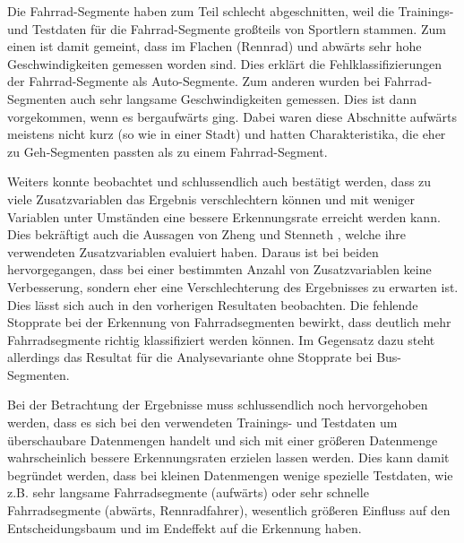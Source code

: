 Die Fahrrad-Segmente haben zum Teil schlecht abgeschnitten, weil die Trainings- und Testdaten für die Fahrrad-Segmente großteils von Sportlern stammen. Zum einen ist damit gemeint, dass im Flachen (Rennrad) und abwärts sehr hohe Geschwindigkeiten gemessen worden sind. Dies erklärt die Fehlklassifizierungen der Fahrrad-Segmente als Auto-Segmente. Zum anderen wurden bei Fahrrad-Segmenten auch sehr langsame Geschwindigkeiten gemessen. Dies ist dann vorgekommen, wenn es bergaufwärts ging. Dabei waren diese Abschnitte aufwärts meistens nicht kurz (so wie in einer Stadt) und hatten Charakteristika, die eher zu Geh-Segmenten passten als zu einem Fahrrad-Segment.

Weiters konnte beobachtet und schlussendlich auch bestätigt werden, dass zu viele Zusatzvariablen das Ergebnis verschlechtern können und mit weniger Variablen unter Umständen eine bessere Erkennungsrate erreicht werden kann. Dies bekräftigt auch die Aussagen von Zheng \cite{zheng_understanding_2010} und Stenneth \cite{stenneth_transportation_2011}, welche ihre verwendeten Zusatzvariablen evaluiert haben. Daraus ist bei beiden hervorgegangen, dass bei einer bestimmten Anzahl von Zusatzvariablen keine Verbesserung, sondern eher eine Verschlechterung des Ergebnisses zu erwarten ist. Dies lässt sich auch in den vorherigen Resultaten beobachten. Die fehlende Stopprate bei der Erkennung von Fahrradsegmenten bewirkt, dass deutlich mehr Fahrradsegmente richtig klassifiziert werden können. Im Gegensatz dazu steht allerdings das Resultat für die Analysevariante ohne Stopprate bei Bus-Segmenten. 

Bei der Betrachtung der Ergebnisse muss schlussendlich noch hervorgehoben werden, dass es sich bei den verwendeten Trainings- und Testdaten um überschaubare Datenmengen handelt und sich mit einer größeren Datenmenge wahrscheinlich bessere Erkennungsraten erzielen lassen werden. Dies kann damit begründet werden, dass bei kleinen Datenmengen wenige spezielle Testdaten, wie z.B. sehr langsame Fahrradsegmente (aufwärts) oder sehr schnelle Fahrradsegmente (abwärts, Rennradfahrer), wesentlich größeren Einfluss auf den Entscheidungsbaum und im Endeffekt auf die Erkennung haben. 

